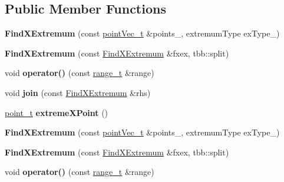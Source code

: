 \subsection*{Public Member Functions}
\begin{DoxyCompactItemize}
\item 
\hypertarget{classFindXExtremum_ac96b38ad5c7f43a420da1b6b0840d92e}{}{\bfseries Find\+X\+Extremum} (const \hyperlink{classtbb_1_1concurrent__vector}{point\+Vec\+\_\+t} \&points\+\_\+, extremum\+Type ex\+Type\+\_\+)\label{classFindXExtremum_ac96b38ad5c7f43a420da1b6b0840d92e}

\item 
\hypertarget{classFindXExtremum_ac883958ab665eb0150d153ea27957aec}{}{\bfseries Find\+X\+Extremum} (const \hyperlink{classFindXExtremum}{Find\+X\+Extremum} \&fxex, tbb\+::split)\label{classFindXExtremum_ac883958ab665eb0150d153ea27957aec}

\item 
\hypertarget{classFindXExtremum_a7b909d6571018b52700fa746f1ec048f}{}void {\bfseries operator()} (const \hyperlink{classtbb_1_1blocked__range}{range\+\_\+t} \&range)\label{classFindXExtremum_a7b909d6571018b52700fa746f1ec048f}

\item 
\hypertarget{classFindXExtremum_a980cc1f34de3547ee0653efb5fbae98a}{}void {\bfseries join} (const \hyperlink{classFindXExtremum}{Find\+X\+Extremum} \&rhs)\label{classFindXExtremum_a980cc1f34de3547ee0653efb5fbae98a}

\item 
\hypertarget{classFindXExtremum_a2eee8fdbed2a1cebbd65beefa756cf83}{}\hyperlink{structutil_1_1point}{point\+\_\+t} {\bfseries extreme\+X\+Point} ()\label{classFindXExtremum_a2eee8fdbed2a1cebbd65beefa756cf83}

\item 
\hypertarget{classFindXExtremum_ac96b38ad5c7f43a420da1b6b0840d92e}{}{\bfseries Find\+X\+Extremum} (const \hyperlink{classtbb_1_1concurrent__vector}{point\+Vec\+\_\+t} \&points\+\_\+, extremum\+Type ex\+Type\+\_\+)\label{classFindXExtremum_ac96b38ad5c7f43a420da1b6b0840d92e}

\item 
\hypertarget{classFindXExtremum_ac883958ab665eb0150d153ea27957aec}{}{\bfseries Find\+X\+Extremum} (const \hyperlink{classFindXExtremum}{Find\+X\+Extremum} \&fxex, tbb\+::split)\label{classFindXExtremum_ac883958ab665eb0150d153ea27957aec}

\item 
\hypertarget{classFindXExtremum_a7b909d6571018b52700fa746f1ec048f}{}void {\bfseries operator()} (const \hyperlink{classtbb_1_1blocked__range}{range\+\_\+t} \&range)\label{classFindXExtremum_a7b909d6571018b52700fa746f1ec048f}


\end{DoxyCompactItemize}
